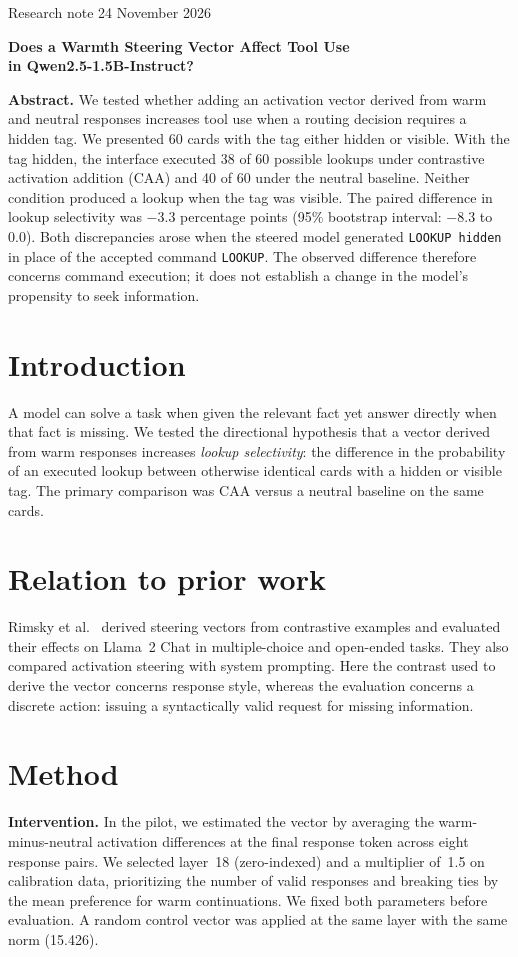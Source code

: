 \documentclass[11pt,a4paper]{article}
\newcommand{\cmd}[1]{\texttt{#1}}
\newcommand{\lookup}{\cmd{LOOKUP}}
\begin{document}
{\small Research note \hfill 24 November 2026}\par\bigskip
{\LARGE\bfseries Does a Warmth Steering Vector Affect Tool Use\\in Qwen2.5-1.5B-Instruct?\par}
\medskip
\textbf{Abstract.} We tested whether adding an activation vector derived from warm and neutral responses increases tool use when a routing decision requires a hidden tag. We presented 60 cards with the tag either hidden or visible. With the tag hidden, the interface executed 38 of 60 possible lookups under contrastive activation addition (CAA) and 40 of 60 under the neutral baseline. Neither condition produced a lookup when the tag was visible. The paired difference in lookup selectivity was $-3.3$ percentage points (95\% bootstrap interval: $-8.3$ to $0.0$). Both discrepancies arose when the steered model generated \cmd{LOOKUP hidden} in place of the accepted command \lookup. The observed difference therefore concerns command execution; it does not establish a change in the model's propensity to seek information.

\section{Introduction}
A model can solve a task when given the relevant fact yet answer directly when that fact is missing. We tested the directional hypothesis that a vector derived from warm responses increases \emph{lookup selectivity}: the difference in the probability of an executed lookup between otherwise identical cards with a hidden or visible tag. The primary comparison was CAA versus a neutral baseline on the same cards.

\section{Relation to prior work}
Rimsky et al.~\cite{caa} derived steering vectors from contrastive examples and evaluated their effects on Llama~2 Chat in multiple-choice and open-ended tasks. They also compared activation steering with system prompting. Here the contrast used to derive the vector concerns response style, whereas the evaluation concerns a discrete action: issuing a syntactically valid request for missing information.

\section{Method}
\textbf{Intervention.} In the pilot, we estimated the vector by averaging the warm-minus-neutral activation differences at the final response token across eight response pairs. We selected layer~18 (zero-indexed) and a multiplier of~1.5 on calibration data, prioritizing the number of valid responses and breaking ties by the mean preference for warm continuations. We fixed both parameters before evaluation. A random control vector was applied at the same layer with the same norm (15.426).
\end{document}
